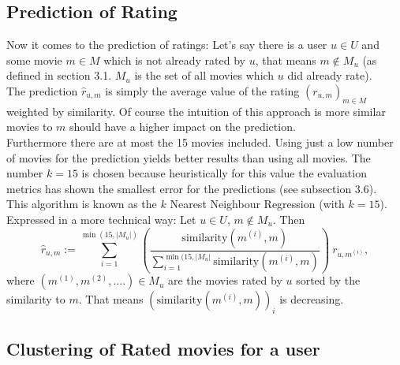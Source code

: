 \documentclass{article}
\begin{document}
\subsection{Prediction of Rating}

Now it comes to the prediction of ratings: Let's say there is a user $u\in U$ and some movie $m\in M$ which is not already rated by $u$, that means $m\notin M_u$ (as defined in section 3.1. $M_u$ is the set of all movies which $u$ did already rate).\\
The prediction $\hat{r}_{u,m}$ is simply the average value of the rating $(r_{u,m})_{m\in M}$ weighted by similarity. Of course the intuition of this approach is more similar movies to $m$ should have a higher impact on the prediction.\\
Furthermore there are at most the 15 movies included. Using just a low number of movies for the prediction yields better results than using all movies. The number $k=15$ is chosen because heuristically for this value the evaluation metrics has shown the smallest error for the predictions (see subsection 3.6).\\
This algorithm is known as the $k$ Nearest Neighbour Regression (with $k=15$).\\[2ex]
Expressed in a more technical way: Let $u\in U$, $m\notin M_u$. Then
\[ \hat{r}_{u,m} := \sum_{i=1}^{\min(15, |M_u|)} \left(\frac{\text{similarity}(m^{(i)}, m)}{\sum_{i=1}^{\min(15, |M_u|} \text{similarity}(m^{(i)}, m)} \right)~r_{u, m^{(i)}},\]
where $(m^{(1)}, m^{(2)}, ....)\in M_u$ are the movies rated by $u$ sorted by the similarity to $m$. That means $(\text{similarity}(m^{(i)},m))_i$ is decreasing.


\subsection{Clustering of Rated movies for a user}
\end{document}
